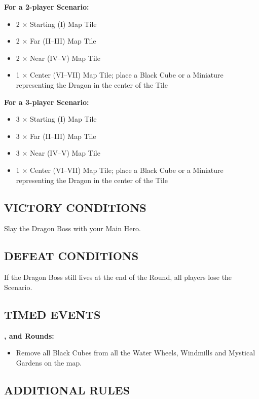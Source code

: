 \begin{multicols*}{2}
\textbf{For a 2-player Scenario:}
\begin{itemize}
  \item 2 × Starting (I) Map Tile
  \item 2 × Far (II--III) Map Tile
  \item 2 × Near (IV--V) Map Tile
  \item 1 × Center (VI--VII) Map Tile; place a Black Cube or a Miniature representing the Dragon in the center of the Tile
\end{itemize}

\textbf{For a 3-player Scenario:}
\begin{itemize}
  \item 3 × Starting (I) Map Tile
  \item 3 × Far (II--III) Map Tile
  \item 3 × Near (IV--V) Map Tile
  \item 1 × Center (VI--VII) Map Tile; place a Black Cube or a Miniature representing the Dragon in the center of the Tile
\end{itemize}

\subsection*{\MakeUppercase{Victory Conditions}}
Slay the Dragon Boss with your Main Hero.

\subsection*{\MakeUppercase{Defeat Conditions}}
If the Dragon Boss still lives at the end of the  Round, all players lose the Scenario.

\subsection*{\MakeUppercase{Timed Events}}

\textbf{,  and  Rounds:}
\begin{itemize}
  \item Remove all Black Cubes from all the Water Wheels, Windmills and Mystical Gardens on the map.
\end{itemize}

\subsection*{\MakeUppercase{Additional Rules}}


\end{multicols*}
